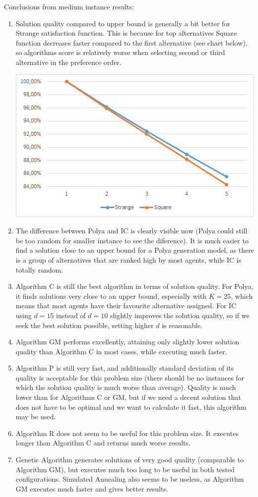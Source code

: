Conclusions from medium instance results:
\begin{enumerate}
	\item Solution quality compared to upper bound is generally a bit better for Strange satisfaction function. This is because for top alternatives Square function decreases faster compared to the first alternative (see chart below), so algorithms score is relatively worse when selecting second or third alternative in the preference order.
	\begin{center}
		\includegraphics[scale=0.75]{satfuncomp1}
	\end{center}
	\item The difference between Polya and IC is clearly visible now (Polya could still be too random for smaller instance to see the diference). It is much easier to find a solution close to an upper bound for a Polya generation model, as there is a group of alternatives that are ranked high by most agents, while IC is totally random.
	\item Algorithm C is still the best algorithm in terms of solution quality. For Polya, it finds solutions very close to an upper bound, especially with $K = 25$, which means that most agents have their favourite alternative assigned. For IC using $d = 15$ instead of $d = 10$ slightly improves the solution quality, so if we seek the best solution possible, setting higher $d$ is reasonable.
	\item Algorithm GM performs excellently, attaining only slightly lower solution quality than Algorithm C in most cases, while executing much faster.
	\item Algorithm P is still very fast, and additionally standard deviation of its quality is acceptable for this problem size (there should be no instances for which the solution quality is much worse than average). Quality is much lower than for Algorithms C or GM, but if we need a decent solution that does not have to be optimal and we want to calculate it fast, this algorithm may be used.
	\item Algorithm R does not seem to be useful for this problem size. It executes longer than Algorithm C and returns much worse results.
	\item Genetic Algorithm generates solutions of very good quality (comparable to Algorithm GM), but executes much too long to be useful in both tested configurations. Simulated Annealing also seems to be useless, as Algorithm GM executes much faster and gives better results.
\end{enumerate}

